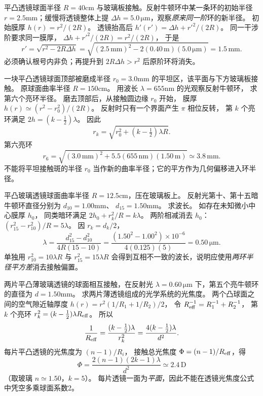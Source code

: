 平凸透镜球面半径 $R=40$cm 与玻璃板接触。反射牛顿环中某一条环的初始半径
$r=2.5$mm；缓慢将透镜整体上提
$\Delta h=5.0\,\mathrm{\mu m}$，观察\emph{原来同一阶}环的新半径。
\exsolution
初始膜厚
$h(r)=r^2/(2R)$。
透镜抬高后
$h'(r')=\Delta h+r'^2/(2R)$。
同一干涉阶要求同一膜厚，
$\Delta h+r'^2/(2R)=r^2/(2R)$，
于是
\[
\boxed{r'=\sqrt{r^2-2R\Delta h}}
=\sqrt{(2.5\,\mathrm{mm})^2-
2(0.40\,\mathrm m)(5.0\,\mathrm{\mu m})}
=\boxed{1.5\,\mathrm{mm}}.
\]
\excheck 必须确认根号内非负；再提升到 $2R\Delta h>r^2$ 后原阶环将消失。

一块平凸透镜球面顶部被磨成半径
$r_0=3.0$mm 的平坦区，该平面与下方玻璃板接触。
原球面曲率半径
$R=150$cm。
用波长 $\lambda=655$nm 的光观察反射牛顿环，
求第六个亮环半径。
\exsolution
磨去顶部后，从接触圆边缘 $r_0$ 开始，
膜厚
$h(r)\simeq(r^2-r_0^2)/(2R)$。
反射时只有一个界面产生 $\pi$ 相位反转，
第 $k$ 个亮环满足
$2h=(k-\tfrac12)\lambda$。
因此
\[
\boxed{r_k=\sqrt{r_0^2+(k-\tfrac12)\lambda R}}.
\]
第六亮环
\[
\boxed{r_6=
\sqrt{(3.0\,\mathrm{mm})^2+
5.5(655\,\mathrm{nm})(1.50\,\mathrm m)}
\simeq3.8\,\mathrm{mm}}.
\]
\excheck 不能将平坦接触斑的半径 $r_0$ 当作新的曲率半径；它的平方作为几何偏移进入环半径。

平凸玻璃透镜球面曲率半径
$R=12.5$cm，压在玻璃板上。
反射光第十、第十五暗牛顿环直径分别为
$d_{10}=1.00$mm、
$d_{15}=1.50$mm。
求波长。
\exsolution
如存在未知微小中心膜厚 $h_0$，
同类暗环满足
$2h_0+r_k^2/R=k\lambda$。
两阶相减消去 $h_0$：
$(r_{15}^2-r_{10}^2)/R=5\lambda$。
因 $r_k=d_k/2$，
\[
\boxed{\lambda=
\frac{d_{15}^2-d_{10}^2}
{4R(15-10)}}
=\frac{(1.50^2-1.00^2)\times10^{-6}}
{4(0.125)(5)}
=\boxed{0.50\,\mathrm{\mu m}}.
\]
\excheck 单独用 $r_{10}^2=10\lambda R$ 与 $r_{15}^2=15\lambda R$ 会得到互相不一致的波长，说明应使用\emph{两环半径平方差}消去接触偏置。

两片平凸薄玻璃透镜的球面相互接触，在反射光
$\lambda=0.60\,\mathrm{\mu m}$ 下，第五个亮牛顿环的直径为
$d=1.50$mm。
求两片薄透镜组成的光学系统的光焦度。
\exsolution
两个凸球面之间的空气隙近轴厚度
$h(r)=r^2(1/R_1+1/R_2)/2$，
令
$R_{\rm eff}^{-1}=R_1^{-1}+R_2^{-1}$，
第 $k$ 个亮环
$r_k^2=(k-\tfrac12)\lambda R_{\rm eff}$。
所以
\[
\frac1{R_{\rm eff}}
=\frac{(k-\tfrac12)\lambda}{r_k^2}
=\frac{4(k-\tfrac12)\lambda}{d^2}.
\]
每片平凸透镜的光焦度为
$(n-1)/R_i$，
接触总光焦度
$\Phi=(n-1)/R_{\rm eff}$，得
\[
\boxed{\Phi=
\frac{2(n-1)(2k-1)\lambda}{d^2}
\simeq2.4\,\mathrm D}
\]
（取玻璃 $n\simeq1.50$，$k=5$）。
\excheck 每片透镜一面为\emph{平面}，因此不能在透镜光焦度公式中凭空多乘球面系数2。

